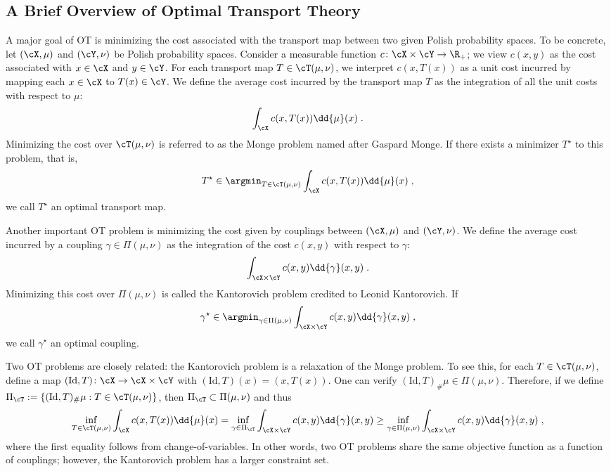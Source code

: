 \documentclass[11pt]{article}
\begin{document}
\subsection{A Brief Overview of Optimal Transport Theory}
A major goal of OT is minimizing the cost associated with the transport map between two given Polish probability spaces. To be concrete, let $(\cX, \mu)$ and $(\cY, \nu)$ be Polish probability spaces. Consider a measurable function $c \colon \cX \times \cY \to \R_{+}$; we view $c(x, y)$ as the cost associated with $x \in \cX$ and $y \in \cY$. For each transport map $T \in \cT(\mu, \nu)$, we interpret $c(x, T(x))$ as a unit cost incurred by mapping each $x \in \cX$ to $T(x) \in \cY$. We define the average cost incurred by the transport map $T$ as the integration of all the unit costs with respect to $\mu$:
\begin{equation*}
	\int_{\cX} c(x, T(x)) \dd{\mu}(x) \;.
\end{equation*}
Minimizing the cost over $\cT(\mu, \nu)$ is referred to as the Monge problem named after Gaspard Monge. If there exists a minimizer $T^\star$ to this problem, that is,
\begin{equation*}
	T^\star \in \argmin_{T \in \cT(\mu, \nu)} \int_{\cX} c(x, T(x)) \dd{\mu}(x)\;,
\end{equation*}
we call $T^\star$ an optimal transport map. 

Another important OT problem is minimizing the cost given by couplings between $(\cX, \mu)$ and $(\cY, \nu)$. We define the average cost incurred by a coupling $\gamma \in \Pi(\mu, \nu)$ as the integration of the cost $c(x, y)$ with respect to $\gamma$:
\begin{equation*}
	\int_{\cX \times \cY} c(x, y) \dd{\gamma}(x, y) \;.
\end{equation*}
Minimizing this cost over $\Pi(\mu, \nu)$ is called the Kantorovich problem credited to Leonid Kantorovich. If
\begin{equation*}
	\gamma^\star \in \argmin_{\gamma \in \Pi(\mu, \nu)} \int_{\cX \times \cY} c(x, y) \dd{\gamma}(x, y) \;,
\end{equation*}
we call $\gamma^\star$ an optimal coupling.

Two OT problems are closely related: the Kantorovich problem is a relaxation of the Monge problem. To see this, for each $T \in \cT(\mu, \nu)$, define a map $(\mathrm{Id}, T) \colon \cX \to \cX \times \cY$ with $(\mathrm{Id}, T)(x) = (x, T(x))$. One can verify $(\mathrm{Id}, T)_{\#} \mu \in \Pi(\mu, \nu)$. Therefore, if we define $\Pi_{\cT} := \{(\mathrm{Id}, T)_{\#} \mu : T \in \cT(\mu, \nu)\}$, then $\Pi_{\cT} \subset \Pi(\mu, \nu)$ and thus
\begin{equation*}
	\inf_{T \in \cT(\mu, \nu)} \int_{\cX} c(x, T(x)) \dd{\mu}(x)
	= \inf_{\gamma \in \Pi_{\cT}} \int_{\cX \times \cY} c(x, y) \dd{\gamma}(x, y)
	\ge \inf_{\gamma \in \Pi(\mu, \nu)} \int_{\cX \times \cY} c(x, y) \dd{\gamma}(x, y)\;,
\end{equation*}
where the first equality follows from change-of-variables. In other words, two OT problems share the same objective function as a function of couplings; however, the Kantorovich problem has a larger constraint set.
\end{document}
